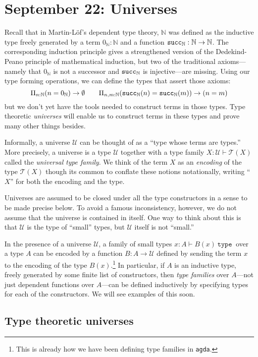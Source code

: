 \documentclass{amsart}
\theoremstyle{theorem}
\theoremstyle{definition}
\theoremstyle{remark}
\newcommand{\0}{\mathbbe{0}}
\newcommand{\1}{\mathbbe{1}}
\newcommand{\2}{\mathbbe{2}}
\newcommand{\3}{\mathbbe{3}}
\newcommand{\4}{\mathbbe{4}}
\newcommand{\univ}{{~\texttt{type}~}}
\newcommand{\term}[1]{{\textup{\texttt{#1}}}}
\newcommand{\bN}{{\mathbb{N}}}
\newcommand{\suc}{\term{succ}_{\bN}}
\newcommand{\UU}{{\mathcal{U}}}
\newcommand{\sT}{\mathcal{T}}
\begin{document}
\section*{September 22: Universes}

Recall that in Martin-L\"{o}f's dependent type theory, $\bN$ was defined as the inductive type freely generated by a term $0_\bN : \bN$ and a function $\suc :\bN \to \bN$. The corresponding induction principle gives a strengthened version of the Dedekind-Peano principle of mathematical induction, but two of the traditional axioms---namely that $0_\bN$ is not a successor and $\suc$ is injective---are missing. Using our type forming operations, we can define the types that assert those axioms:
\[ \Pi_{n : \bN} (n = 0_\bN) \to \emptyset \qquad \Pi_{n,m : \bN} (\suc(n) = \suc(m)) \to (n = m)\]
but we don't yet have the tools needed to construct terms in those types. Type theoretic \emph{universes} will enable us to construct terms in these types and prove many other things besides.

Informally, a universe $\UU$ can be thought of as a ``type whose terms are types.'' More precisely, a universe is a type $\UU$ together with a type family $X : \UU \vdash \sT(X)$ called the \emph{universal type family}. We think of the term $X$ as an \emph{encoding} of the type $\sT(X)$ though its common to conflate these notions notationally, writing ``$X$'' for both the encoding and the type.

Universes are assumed to be closed under all the type constructors in a sense to be made precise below. To avoid a famous inconsistency, however, we do not assume that the universe is contained in itself. One way to think about this is that $\UU$ is the type of ``small'' types, but $\UU$ itself is not ``small.''

In the presence of a universe $\UU$, a family of small types $x : A \vdash B(x) \univ$ over a type $A$ can be encoded by a function $B \colon A \to \UU$ defined by sending the term $x$ to the encoding of the type $B(x)$.\footnote{This is already how we have been defining type families in \texttt{agda}.} In particular, if $A$ is an inductive type, freely generated by some finite list of constructors, then \emph{type families} over $A$---not just dependent functions over $A$---can be defined inductively by specifying types for each of the constructors. We will see examples of this soon.

\subsection*{Type theoretic universes}
\end{document}
